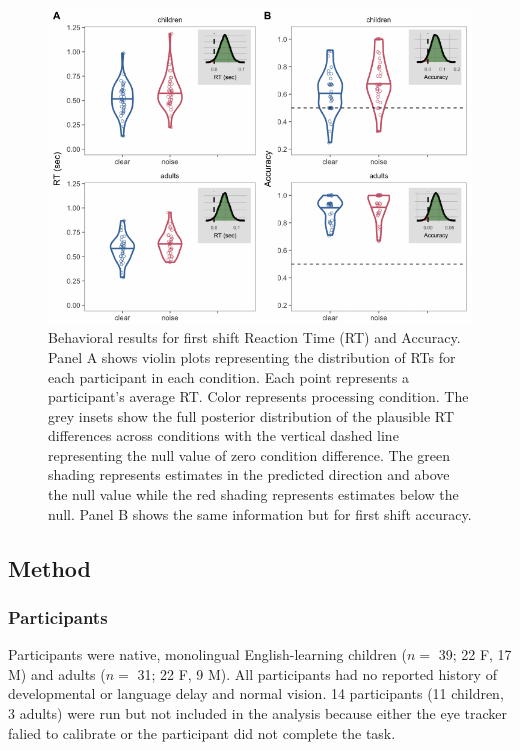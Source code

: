 \documentclass[10pt, letterpaper]{article}
\newenvironment{CodeChunk}{}{}
\begin{document}
\begin{CodeChunk}
\begin{figure}[t]

{\centering \includegraphics[width=0.85\linewidth]{figs/noise_acc_rt_e1_plot-1} 

}

\caption[Behavioral results for first shift Reaction Time (RT) and Accuracy]{Behavioral results for first shift Reaction Time (RT) and Accuracy. Panel A shows violin plots representing the distribution of RTs for each participant in each condition. Each point represents a participant's average RT. Color represents processing condition. The grey insets show the full posterior distribution of the plausible RT differences across conditions with the vertical dashed line representing the null value of zero condition difference. The green shading represents estimates in the predicted direction and above the null value while the red shading represents estimates below the null. Panel B shows the same information but for first shift accuracy.}\label{fig:noise_acc_rt_e1_plot}
\end{figure}
\end{CodeChunk}

\subsection{Method}\label{method}

\subsubsection{Participants}\label{participants}

Participants were native, monolingual English-learning children (\(n=\)
39; 22 F, 17 M) and adults (\(n=\) 31; 22 F, 9 M). All participants had
no reported history of developmental or language delay and normal
vision. 14 participants (11 children, 3 adults) were run but not
included in the analysis because either the eye tracker falied to
calibrate or the participant did not complete the task.
\end{document}
